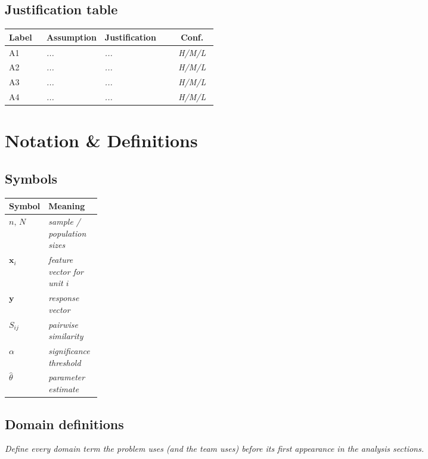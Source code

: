 \documentclass[12pt,a4paper]{article}
\newcommand{\ph}[1]{\textit{\textcolor{phgray}{#1}}}
\begin{document}
\subsection{Justification table}
\begin{tabularx}{\linewidth}{@{}p{0.18\linewidth}p{0.28\linewidth}Xc@{}}
\toprule
\textbf{Label} & \textbf{Assumption} & \textbf{Justification} & \textbf{Conf.} \\
\midrule
A1 & \ph{...} & \ph{...} & \ph{H/M/L} \\
A2 & \ph{...} & \ph{...} & \ph{H/M/L} \\
A3 & \ph{...} & \ph{...} & \ph{H/M/L} \\
A4 & \ph{...} & \ph{...} & \ph{H/M/L} \\
\bottomrule
\end{tabularx}

\section{Notation \& Definitions}
\subsection{Symbols}
\begin{tabularx}{\linewidth}{@{}p{0.18\linewidth}X@{}}
\toprule
\textbf{Symbol} & \textbf{Meaning} \\
\midrule
$n,\, N$       & \ph{sample / population sizes} \\
$\bm{x}_i$     & \ph{feature vector for unit $i$} \\
$\bm{y}$       & \ph{response vector} \\
$S_{ij}$       & \ph{pairwise similarity} \\
$\alpha$       & \ph{significance threshold} \\
$\hat{\theta}$ & \ph{parameter estimate} \\
\bottomrule
\end{tabularx}

\subsection{Domain definitions}
\ph{Define every domain term the problem uses (and the team uses) before its first appearance in the analysis sections.}
\end{document}
